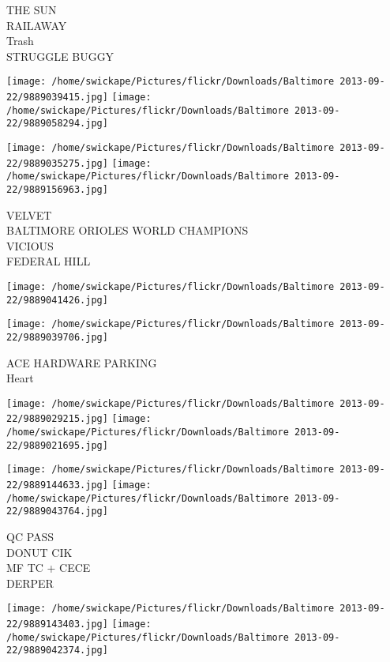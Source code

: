 \documentclass[10pt,letterpaper]{article}
\begin{document}
THE SUN\\
RAILAWAY\\
Trash\\
STRUGGLE BUGGY\\
\pagebreak

\texttt{[image: /home/swickape/Pictures/flickr/Downloads/Baltimore 2013-09-22/9889039415.jpg]}
\texttt{[image: /home/swickape/Pictures/flickr/Downloads/Baltimore 2013-09-22/9889058294.jpg]}

\texttt{[image: /home/swickape/Pictures/flickr/Downloads/Baltimore 2013-09-22/9889035275.jpg]}
\texttt{[image: /home/swickape/Pictures/flickr/Downloads/Baltimore 2013-09-22/9889156963.jpg]}

VELVET\\
BALTIMORE ORIOLES WORLD CHAMPIONS\\
VICIOUS\\
FEDERAL HILL\\
\pagebreak

\texttt{[image: /home/swickape/Pictures/flickr/Downloads/Baltimore 2013-09-22/9889041426.jpg]}

\vspace{0.25in}
\texttt{[image: /home/swickape/Pictures/flickr/Downloads/Baltimore 2013-09-22/9889039706.jpg]}

ACE HARDWARE PARKING\\
Heart\\
\pagebreak

\texttt{[image: /home/swickape/Pictures/flickr/Downloads/Baltimore 2013-09-22/9889029215.jpg]}
\texttt{[image: /home/swickape/Pictures/flickr/Downloads/Baltimore 2013-09-22/9889021695.jpg]}

\texttt{[image: /home/swickape/Pictures/flickr/Downloads/Baltimore 2013-09-22/9889144633.jpg]}
\texttt{[image: /home/swickape/Pictures/flickr/Downloads/Baltimore 2013-09-22/9889043764.jpg]}

QC PASS\\
DONUT CIK\\
MF TC + CECE\\
DERPER\\
\pagebreak

\texttt{[image: /home/swickape/Pictures/flickr/Downloads/Baltimore 2013-09-22/9889143403.jpg]}
\texttt{[image: /home/swickape/Pictures/flickr/Downloads/Baltimore 2013-09-22/9889042374.jpg]}
\end{document}
